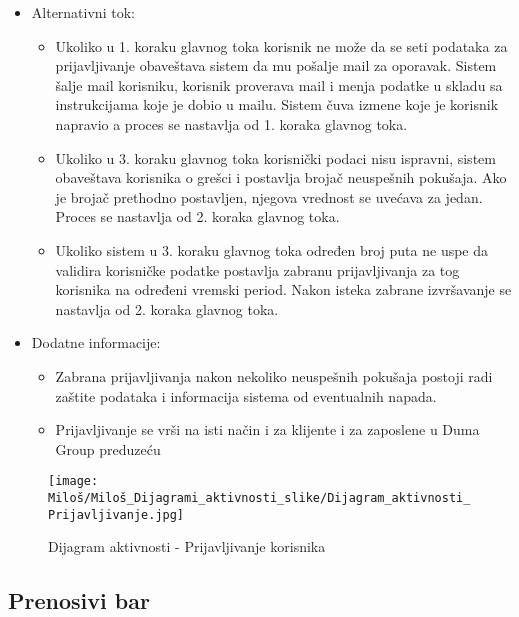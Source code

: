 \documentclass[a4paper]{article}
\begin{document}
\begin{itemize}
\begin{enumerate}
        \end{enumerate}
    \item Alternativni tok:
        \begin{itemize}
            \item Ukoliko u 1. koraku glavnog toka korisnik ne može da se seti podataka za prijavljivanje obaveštava sistem da mu pošalje mail za oporavak. Sistem šalje mail korisniku, korisnik proverava mail i menja podatke u skladu sa instrukcijama koje je dobio u mailu. Sistem čuva izmene koje je korisnik napravio a proces se nastavlja od 1. koraka glavnog toka.
            \item Ukoliko u 3. koraku glavnog toka korisnički podaci nisu ispravni, sistem obaveštava korisnika o grešci i postavlja brojač neuspešnih pokušaja.
            Ako je brojač prethodno postavljen, njegova vrednost se uvećava za jedan. Proces se nastavlja od 2. koraka glavnog toka.
            \item Ukoliko sistem u 3. koraku glavnog toka određen broj puta ne uspe da validira korisničke podatke postavlja zabranu prijavljivanja za tog korisnika na određeni vremski period. Nakon isteka zabrane izvršavanje se nastavlja od 2. koraka glavnog toka.
        \end{itemize}
    \item Dodatne informacije:
        \begin{itemize}
            \item Zabrana prijavljivanja nakon nekoliko neuspešnih pokušaja postoji radi zaštite podataka i informacija sistema od eventualnih napada.
            \item Prijavljivanje se vrši na isti način i za klijente i za zaposlene u Duma Group preduzeću
        \end{itemize}
\end{itemize}


\begin{figure}[htp]
    \centering
    \texttt{[image: Miloš/Miloš\_Dijagrami\_aktivnosti\_slike/Dijagram\_aktivnosti\_Prijavljivanje.jpg]}
    \caption{Dijagram aktivnosti - Prijavljivanje korisnika}
    \label{fig:Prijavljivanje aktivnost}
\end{figure}



\subsection{Prenosivi bar}
\end{document}
